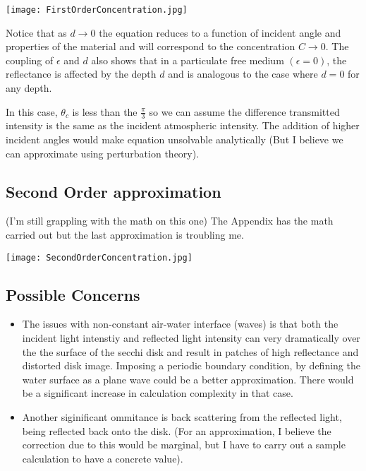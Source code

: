 \documentclass{article}
\begin{document}
\begin{center}
  \texttt{[image: FirstOrderConcentration.jpg]}
\end{center}
Notice that as $d \rightarrow 0 $ the equation reduces to a function of incident angle and properties
of the material and will correspond to the concentration $ C \rightarrow 0 $. The coupling
of $ \epsilon$ and $d$ also shows that in a particulate free medium $(\epsilon = 0)$, the
reflectance is affected by the depth $ d$ and is analogous to the case where $ d = 0$ for
any depth.

In this case, $ \theta_c$ is less than the $ \frac{\pi}{3}$ so we can assume the
difference transmitted intensity is the same as the incident atmospheric intensity. The addition
of higher incident angles would make equation unsolvable analytically
(But I believe we can approximate using perturbation theory).
\subsection{Second Order approximation}
(I'm still grappling with the math on this one)
The Appendix has the math carried out but the last approximation is troubling me.

\begin{center}
\texttt{[image: SecondOrderConcentration.jpg]}
\end{center}

\subsection{Possible Concerns}

\begin{itemize}
  \item The issues with non-constant air-water interface (waves) is that both the incident
  light intenstiy and reflected light intensity can very dramatically over the the
  surface of the secchi disk and result in patches of high reflectance and distorted disk
  image. Imposing a periodic boundary condition, by defining the water surface as a plane
  wave could be a better approximation. There would be a significant increase in calculation
  complexity in that case.
  \item Another siginificant ommitance is back scattering from the reflected light, being reflected
  back onto the disk. (For an approximation, I believe the correction due to this would be
  marginal, but I have to carry out a sample calculation to have a concrete value).
\end{itemize}
\end{document}
